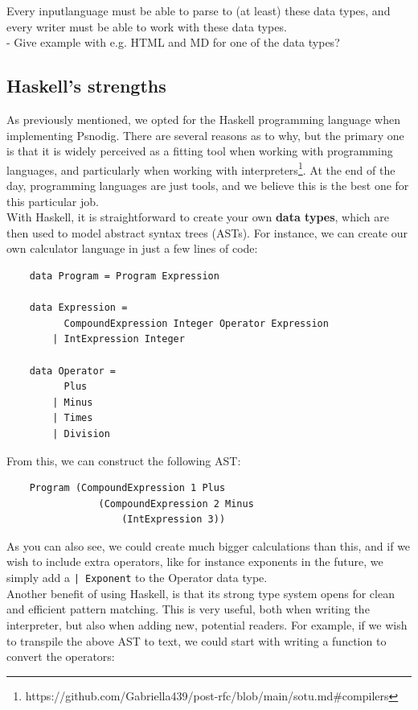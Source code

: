 Every inputlanguage must be able to parse to (at least) these data types, and every writer must be able to work with these data types. \hfill \\

- Give example with e.g. HTML and MD for one of the data types?

\subsection{Haskell's strengths}
As previously mentioned, we opted for the Haskell programming language when implementing Psnodig. There are several reasons as to why, but the primary one is that it is widely perceived as a fitting tool when working with programming languages, and particularly when working with interpreters\footnote{https://github.com/Gabriella439/post-rfc/blob/main/sotu.md\#compilers}. At the end of the day, programming languages are just tools, and we believe this is the best one for this particular job. \hfill \\

With Haskell, it is straightforward to create your own \textbf{data types}, which are then used to model abstract syntax trees (ASTs). For instance, we can create our own calculator language in just a few lines of code:

\begin{verbatim}
    data Program = Program Expression

    data Expression =
          CompoundExpression Integer Operator Expression
        | IntExpression Integer

    data Operator =
          Plus
        | Minus
        | Times
        | Division
\end{verbatim}

From this, we can construct the following AST:

\begin{verbatim}
    Program (CompoundExpression 1 Plus
                (CompoundExpression 2 Minus
                    (IntExpression 3))
\end{verbatim}

As you can also see, we could create much bigger calculations than this, and if we wish to include extra operators, like for instance exponents in the future, we simply add a \texttt{| Exponent} to the Operator data type. \hfill \\

Another benefit of using Haskell, is that its strong type system opens for clean and efficient pattern matching. This is very useful, both when writing the interpreter, but also when adding new, potential readers. For example, if we wish to transpile the above AST to text, we could start with writing a function to convert the operators:

